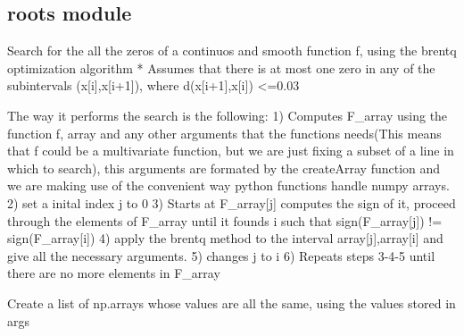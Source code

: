 \documentclass[letterpaper,10pt,english]{sphinxmanual}
\begin{document}
\begin{fulllineitems}
\label{Analisis/bounds:bounds.procce_}
\end{fulllineitems}



\subsection{roots module}
\label{Analisis/roots:roots-module}\label{Analisis/roots:module-roots}\label{Analisis/roots::doc}

\begin{fulllineitems}
\label{Analisis/roots:roots.Get_roots}
Search for the all the zeros of a continuos and smooth function f, using the brentq optimization algorithm
* Assumes that there is at most one zero in any of the subintervals (x{[}i{]},x{[}i+1{]}), where d(x{[}i+1{]},x{[}i{]}) \textless{}=0.03

The way it performs the search is the following:
1) Computes F\_array using the function f, array and any other arguments that the functions needs(This means that f could be a multivariate function,
but we are just fixing a subset of a line in which to search), this arguments are formated by the createArray function and we are making use of the convenient
way python functions handle numpy arrays.
2) set a inital index j to 0
3) Starts at F\_array{[}j{]} computes the sign of it, proceed through the elements of F\_array until it founds i such that sign(F\_array{[}j{]}) != sign(F\_array{[}i{]}) 
4) apply the brentq method to the interval array{[}j{]},array{[}i{]} and give all the necessary arguments.
5) changes j to i
6) Repeats steps 3-4-5 until there are no more elements in F\_array

\end{fulllineitems}


\begin{fulllineitems}
\label{Analisis/roots:roots.createArray}
Create a list of np.arrays whose values are all the same, using the values stored in args

\end{fulllineitems}
\end{document}
